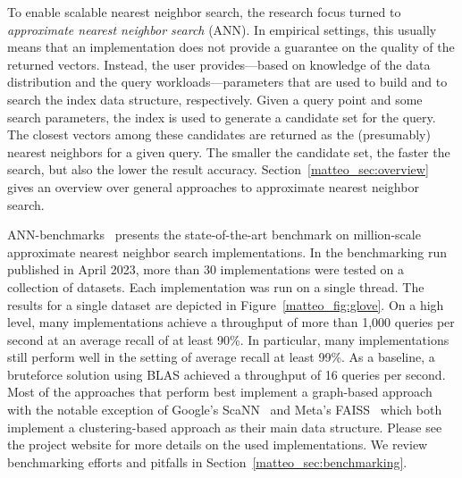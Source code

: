 \documentclass[11pt]{article}
\begin{document}
To enable scalable nearest neighbor search, the research focus turned to \emph{approximate nearest neighbor search} (ANN).
In empirical settings, this usually means that an implementation does not provide a guarantee on the quality of the returned vectors.
Instead, the user provides---based on knowledge of the data distribution and the query workloads---parameters that are used to build and to search the index data structure, respectively.
Given a query point and some search parameters, the index is used to generate a candidate set for the query.
The closest vectors among these candidates are returned as the (presumably) nearest neighbors for a given query.
The smaller the candidate set, the faster the search, but also the lower the result accuracy.
Section~\ref{matteo_sec:overview} gives an overview over general approaches to approximate nearest neighbor search.

ANN-benchmarks~\cite{DBLP:journals/is/AumullerBF20} presents the state-of-the-art benchmark on million-scale approximate nearest neighbor search implementations.
In the benchmarking run published in April 2023, more than 30 implementations were tested on a collection of datasets. Each implementation was run on a single thread.
The results for a single dataset are depicted in Figure~\ref{matteo_fig:glove}.
On a high level, many implementations achieve a throughput of more than 1,000 queries per second at an average recall of at least 90\%.
In particular, many implementations still perform well in the setting of average recall at least 99\%.
As a baseline, a bruteforce solution using BLAS achieved a throughput of 16 queries per second.
Most of the approaches that perform best implement a graph-based approach with the notable exception of Google's ScaNN~\cite{DBLP:conf/icml/GuoSLGSCK20} and Meta's FAISS~\cite{DBLP:journals/tbd/JohnsonDJ21} which both implement a clustering-based approach as their main data structure.
Please see the project website for more details on the used implementations.
We review benchmarking efforts and pitfalls in Section~\ref{matteo_sec:benchmarking}.
\end{document}
